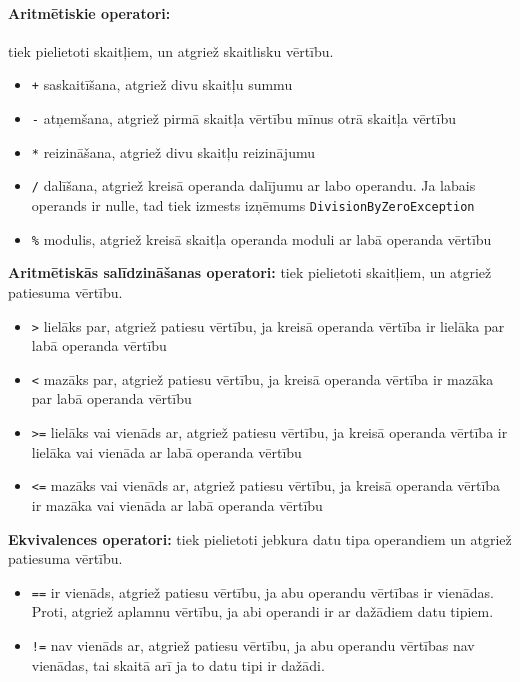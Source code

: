 \documentclass[12pt,a4paper]{report}
\begin{document}
\paragraph{Aritmētiskie operatori:} tiek pielietoti skaitļiem, un atgriež skaitlisku vērtību.

\begin{itemize}
  \item \texttt{+} saskaitīšana, atgriež divu skaitļu summu
  \item \texttt{-} atņemšana, atgriež pirmā skaitļa vērtību mīnus otrā skaitļa vērtību
  \item \texttt{*} reizināšana, atgriež divu skaitļu reizinājumu
  \item \texttt{/} dalīšana, atgriež kreisā operanda dalījumu ar labo operandu. Ja labais operands ir nulle, tad tiek izmests izņēmums \texttt{DivisionByZeroException}
  \item \texttt{\%} modulis, atgriež kreisā skaitļa operanda moduli ar labā operanda vērtību
\end{itemize}

\textbf{Aritmētiskās salīdzināšanas operatori:} tiek pielietoti skaitļiem, un atgriež patiesuma vērtību. 
\begin{itemize}
  \item \texttt{>} lielāks par, atgriež patiesu vērtību, ja kreisā operanda vērtība ir lielāka par labā operanda vērtību
  \item \texttt{<} mazāks par, atgriež patiesu vērtību, ja kreisā operanda vērtība ir mazāka par labā operanda vērtību
  \item \texttt{>=} lielāks vai vienāds ar, atgriež patiesu vērtību, ja kreisā operanda vērtība ir lielāka vai vienāda ar labā operanda vērtību
  \item \texttt{<=} mazāks vai vienāds ar, atgriež patiesu vērtību, ja kreisā operanda vērtība ir mazāka vai vienāda ar labā operanda vērtību
\end{itemize}

\textbf{Ekvivalences operatori:} tiek pielietoti jebkura datu tipa operandiem un atgriež patiesuma vērtību. 
\begin{itemize}
  \item \texttt{==} ir vienāds, atgriež patiesu vērtību, ja abu operandu vērtības ir vienādas. Proti, atgriež aplamnu vērtību, ja abi operandi ir ar dažādiem datu tipiem.
  \item \texttt{!=} nav vienāds ar, atgriež patiesu vērtību, ja abu operandu vērtības nav vienādas, tai skaitā arī ja to datu tipi ir dažādi.
\end{itemize}
\end{document}
